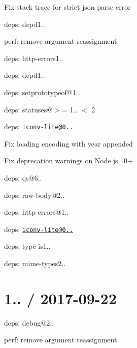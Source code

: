 
\begin{DoxyItemize}
\item Fix stack trace for strict json parse error
\item deps\+: depd1..
\begin{DoxyItemize}
\item perf\+: remove argument reassignment
\end{DoxyItemize}
\item deps\+: http-\/errors1..
\begin{DoxyItemize}
\item deps\+: depd1..
\item deps\+: setprototypeof@1..
\item deps\+: statuses@\textquotesingle{}$>$= 1.. $<$ 2\textquotesingle{}
\end{DoxyItemize}
\item deps\+: \href{mailto:iconv-lite@0.4.23}{\tt iconv-\/lite@0..}
\begin{DoxyItemize}
\item Fix loading encoding with year appended
\item Fix deprecation warnings on Node.\+js 10+
\end{DoxyItemize}
\item deps\+: qs@6..
\item deps\+: raw-\/body@2..
\begin{DoxyItemize}
\item deps\+: http-\/errors@1..
\item deps\+: \href{mailto:iconv-lite@0.4.23}{\tt iconv-\/lite@0..}
\end{DoxyItemize}
\item deps\+: type-\/is1..
\begin{DoxyItemize}
\item deps\+: mime-\/types2..
\end{DoxyItemize}
\end{DoxyItemize}

\section*{1.. / 2017-\/09-\/22 }


\begin{DoxyItemize}
\item deps\+: debug@2..
\item perf\+: remove argument reassignment
\end{DoxyItemize}

